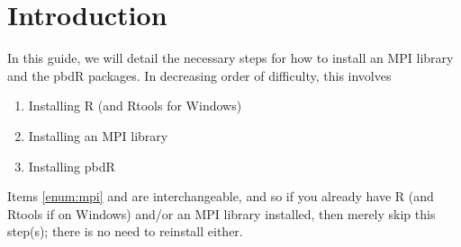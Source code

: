\section{Introduction}

In this guide, we will detail the necessary steps for how to install an MPI library and the pbdR packages.  In decreasing order of difficulty, this involves
\begin{enumerate}
  \item Installing R (and Rtools for Windows) \label{enum:r}
  \item Installing an MPI library\label{enum:mpi}
  \item Installing pbdR
\end{enumerate}

Items \ref{enum:mpi} and \label{enum:r} are interchangeable, and so if you already have R (and Rtools if on Windows) and/or an MPI library installed, then merely skip this step(s); there is no need to reinstall either.
